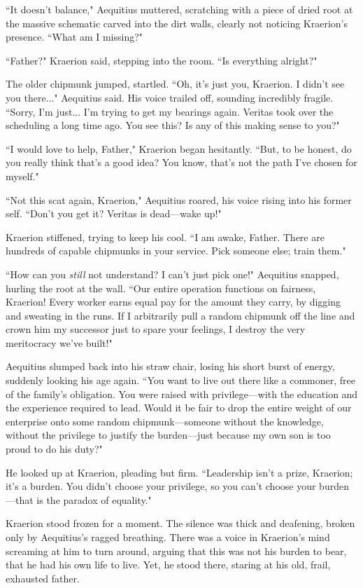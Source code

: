 ``It doesn't balance," Aequitius muttered, scratching with a piece of dried root at the massive schematic carved into the dirt walls, clearly not noticing Kraerion's presence.
``What am I missing?"

``Father?" Kraerion said, stepping into the room. ``Is everything alright?"

The older chipmunk jumped, startled.
``Oh, it's just you, Kraerion.
I didn't see you there..." Aequitius said. His voice trailed off, sounding incredibly fragile.
``Sorry, I'm just... I'm trying to get my bearings again.
Veritas took over the scheduling a long time ago.
You see this?
Is any of this making sense to you?"

``I would love to help, Father," Kraerion began hesitantly.
``But, to be honest, do you really think that's a good idea?
You know, that's not the path I've chosen for myself."

``Not this scat again, Kraerion," Aequitius roared, his voice rising into his former self.
``Don't you get it?
Veritas is dead---wake up!"

Kraerion stiffened, trying to keep his cool. ``I am awake, Father.
There are hundreds of capable chipmunks in your service.
Pick someone else; train them."

``How can you \textit{still} not understand?
I can't just pick one!" Aequitius snapped, hurling the root at the wall.
``Our entire operation functions on fairness, Kraerion!
Every worker earns equal pay for the amount they carry, by digging and sweating in the runs.
If I arbitrarily pull a random chipmunk off the line and crown him my successor just to spare your feelings, I destroy the very meritocracy we've built!"

Aequitius slumped back into his straw chair, losing his short burst of energy, suddenly looking his age again.
``You want to live out there like a commoner, free of the family's obligation.
You were raised with privilege---with the education and the experience required to lead.
Would it be fair to drop the entire weight of our enterprise onto some random chipmunk---someone without the knowledge, without the privilege to justify the burden---just because my own son is too proud to do his duty?"

He looked up at Kraerion, pleading but firm.
``Leadership isn't a prize, Kraerion; it's a burden.
You didn't choose your privilege, so you can't choose your burden---that is the paradox of equality."

Kraerion stood frozen for a moment.
The silence was thick and deafening, broken only by Aequitius's ragged breathing.
There was a voice in Kraerion's mind screaming at him to turn around, arguing that this was not his burden to bear, that he had his own life to live.
Yet, he stood there, staring at his old, frail, exhausted father.

